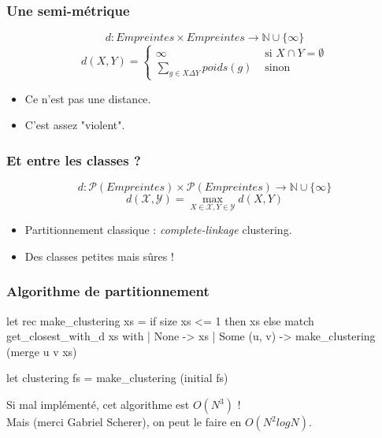 \documentclass[11pt]{beamer}
\newenvironment{ocaml}
{\small\VerbatimEnvironment
	\begin{myocaml}}
	{\end{myocaml}}
\begin{document}
\begin{frame}
	\frametitle{Une semi-métrique}
	\begin{definition}[Dissimilarité]
		$$
		d : Empreintes \times Empreintes \to \mathbb{N} \cup \{ \infty \}
		$$
		\begin{equation*}
		d (X,Y) = \begin{cases} 
		\infty & \text{ si $X \cap Y = \emptyset$} \\
		\sum\limits_{g \in X \Delta Y} poids(g) & \text{ sinon }
		\end{cases}
		\end{equation*}
	\end{definition}
	
	\begin{itemize}
		\item Ce n'est pas une distance.
		\item C'est assez "violent".
	\end{itemize}
\end{frame}

\begin{frame}
	\frametitle{Et entre les classes ?}
	\begin{definition}
		$$
		d : \mathcal{P}(Empreintes) \times \mathcal{P}(Empreintes) \to \mathbb{N} \cup \{ \infty \}
		$$
		$$
		d (\mathcal{X},\mathcal{Y}) = \max\limits_{X \in \mathcal{X},Y \in \mathcal{Y}} d(X,Y) $$
	\end{definition}
	\begin{itemize}
		\item Partitionnement classique : \emph{complete-linkage} clustering.
		\item Des classes petites mais sûres !
	\end{itemize}
\end{frame}

\begin{frame}[fragile]
	\frametitle{Algorithme de partitionnement}
	
\begin{ocaml}
let rec make_clustering xs =
  if size xs <= 1 
  then xs 
  else
    match get_closest_with_d xs with
    | None -> xs
    | Some (u, v) -> make_clustering (merge u v xs)

let clustering fs = 
  make_clustering (initial fs)
\end{ocaml}
	
\pause 
	
Si mal implémenté, cet algorithme est $O(N^3)$ !\\
Mais (merci Gabriel Scherer), on peut le faire en $O(N^2 log N)$.
\end{frame}
\end{document}
